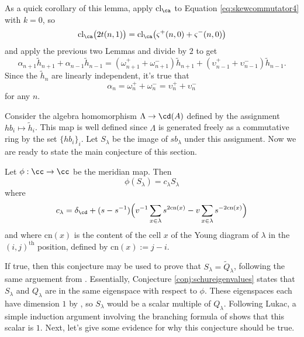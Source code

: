 \begin{remark}
As a quick corollary of this lemma, apply $\textrm{cl}_\ca$ to Equation \eqref{eq:skewcommutator4} with $k=0$, so
\[
\textrm{cl}_\ca \big( 2 t(n, 1) \big) = \textrm{cl}_\ca \big( \varsigma^+ (n, 0) + \varsigma^- (n, 0) \big)
\]
and apply the previous two Lemmas and divide by $2$ to get
\[
\alpha_{n+1} \tilde{h}_{n+1} + \alpha_{n-1} \tilde{h}_{n-1} = (\omega^+_{n+1} + \omega^-_{n+1}) \tilde{h}_{n+1} + (\upsilon^+_{n-1} + \upsilon^-_{n-1}) \tilde{h}_{n-1}.
\]
Since the $\tilde{h}_n$ are linearly independent, it's true that 
\begin{equation}
\alpha_n = \omega_n^+ + \omega_n^- = \upsilon_n^+ + \upsilon_n^-
\end{equation}
for any $n$. 
\end{remark}

Consider the algebra homomorphism $\Lambda \to \cd(A)$ defined by the assignment $hb_i \mapsto \tilde{h}_i$. This map is well defined since $\Lambda$ is generated freely as a commutative ring by the set $\{hb_i\}_{i}$. Let $S_\lambda$ be the image of $sb_\lambda$ under this assignment. Now we are ready to state the main conjecture of this section.
\begin{conjecture} \label{conj:schureigenvalues}
Let $\phi: \cc \to \cc$ be the meridian map.  Then
\begin{equation}
\phi ( S_\lambda ) = c_\lambda S_\lambda
\end{equation}
where
\begin{equation}
c_\lambda = \delta_\cd + ( s - s^{-1} ) \Big( v^{-1} \sum_{x \in \lambda} s^{2 \textrm{cn}(x)} - v \sum_{x \in \lambda} s^{-2 \textrm{cn}(x)} \Big)
\end{equation}
and where $\textrm{cn}(x)$ is the content of the cell $x$ of the Young diagram of $\lambda$ in the $(i,j)^{\textrm{th}}$ position, defined by $\textrm{cn}(x) := j-i$.
\end{conjecture}

If true, then this conjecture may be used to prove that $S_\lambda = \widetilde{Q}_\lambda$, following the same arguement from \cite{Luk05}. Essentially, Conjecture \ref{conj:schureigenvalues} states that $S_\lambda$ and $Q_\lambda$ are in the same eigenspace with respect to $\phi$. These eigenspaces each have dimension $1$ by \cite{LZ02}, so $S_\lambda$ would be a scalar multiple of $Q_\lambda$. Following Lukac, a simple induction argument involving the branching formula of \cite{BB01} shows that this scalar is $1$. Next, let's give some evidence for why this conjecture should be true. 

